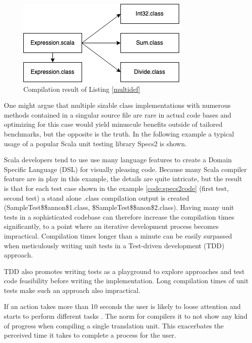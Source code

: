 \documentclass{VUMIFPSbakalaurinis}
\begin{document}
\begin{figure}[H]
    \centering
    \includegraphics[scale=0.6]{img/Expression}
    \caption{Compilation result of Listing \ref{multidef}}
    \label{img:Expression}
\end{figure}

One might argue that multiple sizable class implementations with numerous methods contained in a singular source file are rare in actual code bases and optimizing for this case would yield minuscule benefits outside of tailored benchmarks, but the opposite is the truth. %
In the following example a typical usage of a popular Scala unit testing library Specs2 \cite{Specs2Github} is shown.



Scala developers tend to use use many language features to create a Domain Specific Language (DSL) for visually pleasing code.
Because many Scala compiler feature are in play in this example, the details are quite intricate, but the result is that for each test case shown in the example \ref{code:specs2code} (first test, second test) a stand alone .class compilation output is created (SampleTest\$\$annon\$1.class, \$SampleTest\$\$anon\$2.class).
Having many unit tests in a sophisticated codebase can therefore increase the compilation times significantly, to a point where an iterative development process becomes impractical.
Compilation times longer than a minute can be easily surpassed when meticulously writing unit tests in a Test-driven development (TDD) approach.

TDD also promotes writing tests as a playground to explore approaches and test code feasibility before writing the implementation.
Long compilation times of unit tests make such an approach also impractical.

If an action takes more than 10 seconds the user is likely to loose attention and starts to perform different tasks \cite{Usability}.
The norm for compilers it to not show any kind of progress when compiling a single translation unit.
This exacerbates the perceived time it takes to complete a process for the user\cite{Usability}.
\end{document}
